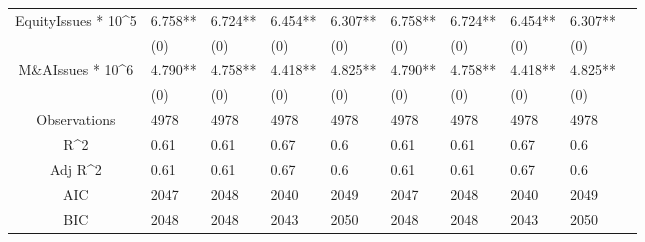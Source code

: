 \documentclass{article}
\begin{document}
\begin{table}[H]
\begin{tabular}{|clllllllll|}
  EquityIssues * 10^5 & 6.758** & 6.724** & 6.454** & 6.307** & 6.758** & 6.724** & 6.454** & 6.307** & \\ 
   & (0) & (0) & (0) & (0) & (0) & (0) & (0) & (0) & \\ 
  M\&AIssues * 10^6 & 4.790** & 4.758** & 4.418** & 4.825** & 4.790** & 4.758** & 4.418** & 4.825** & \\ 
   & (0) & (0) & (0) & (0) & (0) & (0) & (0) & (0) & \\ 
  \hline 
 Observations & 4978 & 4978 & 4978 & 4978 & 4978 & 4978 & 4978 & 4978 & \\ 
  R^2 & 0.61 & 0.61 & 0.67 & 0.6 & 0.61 & 0.61 & 0.67 & 0.6 & \\ 
  Adj R^2 & 0.61 & 0.61 & 0.67 & 0.6 & 0.61 & 0.61 & 0.67 & 0.6 & \\ 
  AIC & 2047 & 2048 & 2040 & 2049 & 2047 & 2048 & 2040 & 2049 & \\ 
  BIC & 2048 & 2048 & 2043 & 2050 & 2048 & 2048 & 2043 & 2050 & \\ 
   \hline
\end{tabular}
 
\end{table}
\end{document}
